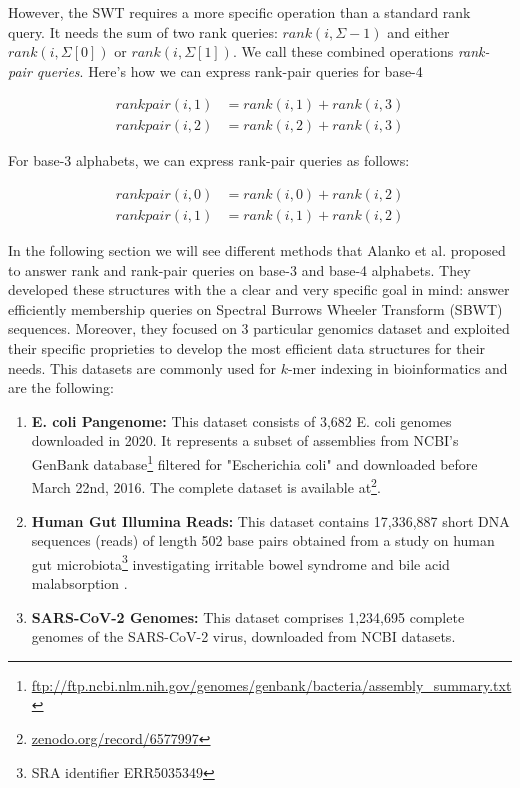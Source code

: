 \noindent However, the SWT requires a more specific operation than a standard rank query. It needs the sum of two rank queries: $rank(i, \Sigma - 1)$ and either $rank(i, \Sigma[0])$ or $rank(i, \Sigma[1])$. We call these combined operations \emph{rank-pair queries}. Here's how we can express rank-pair queries for base-4

\begin{align}
    rankpair(i,1) & = rank(i,1) + rank(i,3) \\
    rankpair(i,2) & = rank(i,2) + rank(i,3)
\end{align}

\noindent For base-3 alphabets, we can express rank-pair queries as follows:

\begin{align}
    rankpair(i,0) & = rank(i,0) + rank(i,2) \\
    rankpair(i,1) & = rank(i,1) + rank(i,2)
\end{align}

\noindent In the following section we will see different methods that Alanko et al. \cite{SubsetWT} proposed to answer rank and rank-pair queries on base-3 and base-4 alphabets. They developed these structures with the a clear and very specific goal in mind: answer efficiently membership queries on Spectral Burrows Wheeler Transform (SBWT) sequences. Moreover, they focused on 3 particular genomics dataset and exploited their specific proprieties to develop the most efficient data structures for their needs. This datasets are commonly used for $k$-mer indexing in bioinformatics and are the following:

\begin{enumerate} \label{datasets}
    \item \textbf{E. coli Pangenome:} This dataset consists of 3,682 E. coli genomes downloaded in 2020. It represents a subset of assemblies from NCBI's GenBank database\footnote{\url{ftp://ftp.ncbi.nlm.nih.gov/genomes/genbank/bacteria/assembly\_summary.txt}} filtered for "Escherichia coli" and downloaded before March 22nd, 2016. The complete dataset is available at\footnote{\url{zenodo.org/record/6577997}}.
    \item \textbf{Human Gut Illumina Reads:} This dataset contains 17,336,887 short DNA sequences (reads) of length 502 base pairs obtained from a study on human gut microbiota\footnote{SRA identifier ERR5035349} investigating irritable bowel syndrome and bile acid malabsorption \cite{jeffery2020differences}.
    \item \textbf{SARS-CoV-2 Genomes:} This dataset comprises 1,234,695 complete genomes of the SARS-CoV-2 virus, downloaded from NCBI datasets.
\end{enumerate}

